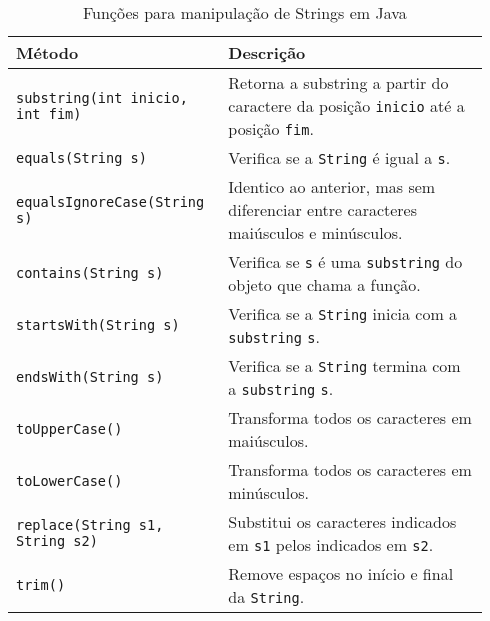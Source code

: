 \begin{table}[H]
	\centering
	\begin{tabular}{>{\raggedleft}p{0.41\linewidth}|p{0.535\linewidth}}
		\hline
		\textbf{Método}   						& \textbf{Descrição}                                                                         \\ \hline
		\texttt{substring(int inicio, int fim)} & Retorna a substring a partir do caractere da posição  \texttt{inicio} até a posição \texttt{fim}. \\
		\texttt{equals(String s)}               & Verifica se a \texttt{String} é igual a \texttt{s}.                                                    \\
		\texttt{equalsIgnoreCase(String s)}     & Identico ao anterior, mas sem diferenciar entre caracteres maiúsculos e minúsculos. \\
		\texttt{contains(String s)}             & Verifica se \texttt{s} é uma \texttt{substring} do objeto que chama a função.                         \\
		\texttt{startsWith(String s)}           & Verifica se a \texttt{String} inicia com a \texttt{substring} \texttt{s}.                                      \\
		\texttt{endsWith(String s)}             & Verifica se a \texttt{String} termina com a \texttt{substring} \texttt{s}.                                     \\
		\texttt{toUpperCase()}                  & Transforma todos os caracteres em maiúsculos.                                       \\
		\texttt{toLowerCase()}                  & Transforma todos os caracteres em minúsculos.                                      \\
		\texttt{replace(String s1, String s2)}  & Substitui os caracteres indicados em \texttt{s1} pelos indicados em \texttt{s2}.                 \\
		\texttt{trim()}                         & Remove espaços no início e final da \texttt{String}.      \\ \hline                                  
	\end{tabular}
	\caption{Funções para manipulação de Strings em Java}
	\label{tab:manipulacao-strings}
\end{table}